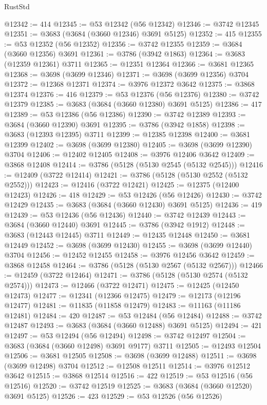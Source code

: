 \begin{lexlean}{RustStd}
\begin{coremodule}
{\begin{coremodule}
{{{{{{{{{{{{{{{{{{{{{{{{{{{{{{{{{{{{{{{{{{{{{{{@12342 := 414
@12345 := @53 @12342 (@56 @12342)
@12346 := @3742 @12345
@12351 := @3683 (@3684 (@3660 @12346) @3691 @5125)
@12352 := 415
@12355 := @53 @12352 (@56 @12352)
@12356 := @3742 @12355
@12359 := @3684 (@3660 @12356) @3691
@12361 := @3786 (@3942 @1863)
@12364 := @3683 (@12359 @12361) @3711
@12365 := @12351 @12364
@12366 := @3681 @12365
@12368 := @3698 (@3699 @12346)
@12371 := @3698 (@3699 @12356) @3704
@12372 := @12368 @12371
@12374 := @3976 @12372 @3642
@12375 := @3868 @12374
@12376 := 416
@12379 := @53 @12376 (@56 @12376)
@12380 := @3742 @12379
@12385 := @3683 (@3684 (@3660 @12380) @3691 @5125)
@12386 := 417
@12389 := @53 @12386 (@56 @12386)
@12390 := @3742 @12389
@12393 := @3684 (@3660 @12390) @3691
@12395 := @3786 (@3942 @1858)
@12398 := @3683 (@12393 @12395) @3711
@12399 := @12385 @12398
@12400 := @3681 @12399
@12402 := @3698 (@3699 @12380)
@12405 := @3698 (@3699 @12390) @3704
@12406 := @12402 @12405
@12408 := @3976 @12406 @3642
@12409 := @3868 @12408
@12414 := @3786 (@5128 (@5130 @2545 (@5132 @2545)))
@12416 := @12409 (@3722 @12414)
@12421 := @3786 (@5128 (@5130 @2552 (@5132 @2552)))
@12423 := @12416 (@3722 @12421)
@12425 := @12375 (@12400 @12423)
@12426 := 418
@12429 := @53 @12426 (@56 @12426)
@12430 := @3742 @12429
@12435 := @3683 (@3684 (@3660 @12430) @3691 @5125)
@12436 := 419
@12439 := @53 @12436 (@56 @12436)
@12440 := @3742 @12439
@12443 := @3684 (@3660 @12440) @3691
@12445 := @3786 (@3942 @1912)
@12448 := @3683 (@12443 @12445) @3711
@12449 := @12435 @12448
@12450 := @3681 @12449
@12452 := @3698 (@3699 @12430)
@12455 := @3698 (@3699 @12440) @3704
@12456 := @12452 @12455
@12458 := @3976 @12456 @3642
@12459 := @3868 @12458
@12464 := @3786 (@5128 (@5130 @2567 (@5132 @2567)))
@12466 := @12459 (@3722 @12464)
@12471 := @3786 (@5128 (@5130 @2574 (@5132 @2574)))
@12473 := @12466 (@3722 @12471)
@12475 := @12425 (@12450 @12473)
@12477 := @12341 (@12366 @12475)
@12479 := @12173 (@12196 @12477)
@12481 := @11835 (@11858 @12479)
@12483 := @11163 (@11186 @12481)
@12484 := 420
@12487 := @53 @12484 (@56 @12484)
@12488 := @3742 @12487
@12493 := @3683 (@3684 (@3660 @12488) @3691 @5125)
@12494 := 421
@12497 := @53 @12494 (@56 @12494)
@12498 := @3742 @12497
@12504 := @3683 (@3684 (@3660 @12498) @3691 @9177) @3711
@12505 := @12493 @12504
@12506 := @3681 @12505
@12508 := @3698 (@3699 @12488)
@12511 := @3698 (@3699 @12498) @3704
@12512 := @12508 @12511
@12514 := @3976 @12512 @3642
@12515 := @3868 @12514
@12516 := 422
@12519 := @53 @12516 (@56 @12516)
@12520 := @3742 @12519
@12525 := @3683 (@3684 (@3660 @12520) @3691 @5125)
@12526 := 423
@12529 := @53 @12526 (@56 @12526)
}}}}}}}}}}}}}}}}}}}}}}}}}}}}}}}}}}}}}}}}}}}}}}}
\end{coremodule}}
\end{coremodule}
\end{lexlean}
